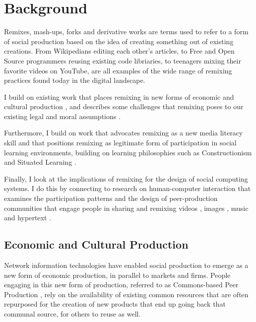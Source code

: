 \chapter{Background}

Remixes, mash-ups, forks and derivative works are terms used to refer to a form of social production based on the idea of creating something out of existing creations.
From Wikipedians editing each other's articles, to Free and Open Source programmers reusing existing code libriaries, to teenagers mixing their favorite videos on YouTube, are all examples of the wide range of remixing practices found today in the digital landscape.

I build on existing work that places remixing in new forms of economic and cultural production \citep{benkler_wealth_2006,jenkins_convergence_2006,manovich_remix_2005,sinnreich_ethics_2009}, and describes some challenges that remixing poses to our existing legal and moral assumptions \citep{lessig_remix:_2008, posner_little_2007}.

Furthermore, I build on work that advocates remixing as a new media literacy skill \citep{ito_hanging_2010, jenkins_confronting_2009, livingstone_taking_2008, perkel_copy_2008} and that positions remixing as legitimate form of participation in social learning environments, building on learning philosophies such as Constructionism \citep{papert_mindstorms_1980} and Situated Learning \citep{lave_situated_1991}.

Finally, I look at the implications of remixing for the design of social computing systems. I do this by connecting to research on human-computer interaction that examines the participation patterns and the design of peer-production communities that engage people in sharing and remixing videos \citep{diakopoulos_evolution_2007,shaw_community_2006}, images \citep{seneviratne_policy-aware_2009}, music \citep{cheliotis_analysis_2009} and hypertext \citep{viegas_studying_2004}.

\section{Economic and Cultural Production}

Network information technologies have enabled social production to emerge as a new form of economic production, in parallel to markets and firms.
People engaging in this new form of production, referred to as Commons-based Peer Production \citep{benkler_coases_2002}, rely on the availability of existing common resources that are often repurposed for the creation of new products that end up going back that communal source, for others to reuse as well.

